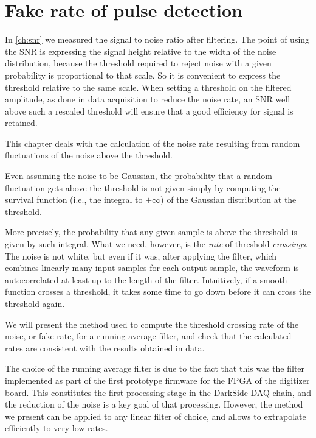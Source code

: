 \chapter{Fake rate of pulse detection}
\label{ch:rate}

In \autoref{ch:snr} we measured the signal to noise ratio after filtering. The
point of using the SNR is expressing the signal height relative to the width of
the noise distribution, because the threshold required to reject noise with a
given probability is proportional to that scale. So it is convenient to express
the threshold relative to the same scale. When setting a threshold on the
filtered amplitude, as done in data acquisition to reduce the noise rate, an
SNR well above such a rescaled threshold will ensure that a good efficiency for
signal is retained.

This chapter deals with the calculation of the noise rate resulting from random
fluctuations of the noise above the threshold.

Even assuming the noise to be Gaussian, the probability that a random
fluctuation gets above the threshold is not given simply by computing the
survival function (i.e., the integral to $+\infty$) of the Gaussian
distribution at the threshold.

More precisely, the probability that any given sample is above the threshold is
given by such integral. What we need, however, is the \emph{rate} of threshold
\emph{crossings}. The noise is not white, but even if it was, after applying
the filter, which combines linearly many input samples for each output sample,
the waveform is autocorrelated at least up to the length of the filter.
Intuitively, if a smooth function crosses a threshold, it takes some time to go
down before it can cross the threshold again.

We will present the method used to compute the threshold crossing rate of the
noise, or fake rate, for a running average filter, and check that the
calculated rates are consistent with the results obtained in data.

The choice of the running average filter is due to the fact that this was the
filter implemented as part of the first prototype firmware for the FPGA of the
digitizer board. This constitutes the first processing stage in the DarkSide
DAQ chain, and the reduction of the noise is a key goal of that processing.
However, the method we present can be applied to any linear filter of choice,
and allows to extrapolate efficiently to very low rates.

